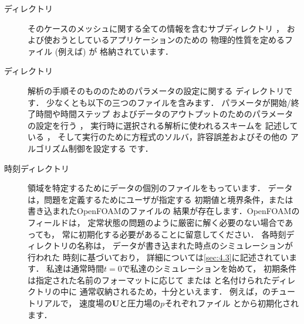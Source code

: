 \begin{description}
 \item[ディレクトリ]
%
%
            そのケースのメッシュに関する全ての情報を含むサブディレクトリ
%
%
            ，
            および使おうとしているアプリケーションのための
            物理的性質を定めるファイル (例えば) が
            格納されています．
 \item[ディレクトリ]
%
%
            解析の手順そのもののためのパラメータの設定に関する
            ディレクトリです．
            少なくとも以下の三つのファイルを含みます．
            パラメータが開始/終了時間や時間ステップ
            およびデータのアウトプットのためのパラメータの設定を行う
%
%
            ，
            実行時に選択される解析に使われるスキームを
            記述している
%
%
            ，
            そして実行のために方程式のソルバ，許容誤差およびその他の
            アルゴリズム制御を設定する
%
%
            です．
 \item[時刻ディレクトリ]
            領域を特定するためにデータの個別のファイルをもっています．
            データは，問題を定義するためにユーザが指定する
            初期値と境界条件，または書き込まれたOpenFOAMのファイルの
            結果が存在します．OpenFOAMのフィールドは，
            定常状態の問題のように厳密に解く必要のない場合であっても，
            常に初期化する必要があることに留意してください．
            各時刻ディレクトリの名称は，
            データが書き込まれた時点のシミュレーションが行われた
            時刻に基づいており，
            詳細については\autoref{sec:4.3}に記述されています．
            私達は通常時間$t = 0$で私達のシミュレーションを始めて，
            初期条件は指定された名前のフォーマットに応じて
%
%
            または
%
%
            と名付けられたディレクトリの中に
            通常収納されるため，十分といえます．
            例えば，のチュートリアルで，
            速度場の$\bm{U}$と圧力場の$p$それぞれファイル
            とから初期化されます．
\end{description}



